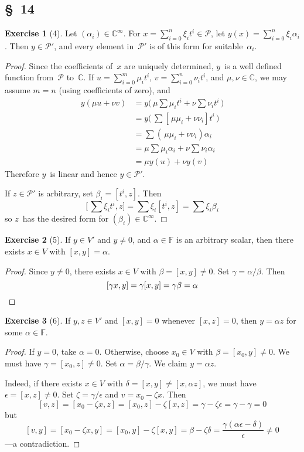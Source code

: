 \documentclass[letterpaper,12pt]{article}
\newcommand{\F}{\mathbb{F}}
\newcommand{\C}{\mathbb{C}}
\renewcommand{\P}{\mathcal{P}}
\theoremstyle{definition}
\newtheorem*{exer}{Exercise}
\theoremstyle{remark}
\theoremstyle{direction}
\begin{document}
\subsection*{\S~14}
\begin{exer}[4]
Let \((\alpha_i)\in\C^{\infty}\). For \(x=\sum_{i=0}^n\xi_i t^i\in\P\), let \(y(x)=\sum_{i=0}^n\xi_i\alpha_i\). Then \(y\in\P'\), and every element in~\(\P'\) is of this form for suitable~\(\alpha_i\).
\end{exer}
\begin{proof}
Since the coefficients of~\(x\) are uniquely determined, \(y\)~is a well defined function from~\(\P\) to~\(\C\). If \(u=\sum_{i=0}^m\mu_i t^i\), \(v=\sum_{i=0}^n\nu_i t^i\), and \(\mu,\nu\in\C\), we may assume \(m=n\) (using coefficients of zero), and
\begin{align*}
y(\mu u+\nu v)&=y\bigl(\,\mu\sum\mu_i t^i+\nu\sum\nu_i t^i\,\bigr)\\
	&=y\bigl(\,\sum[\,\mu\mu_i+\nu\nu_i]t^i\,\bigr)\\
	&=\sum(\,\mu\mu_i+\nu\nu_i)\alpha_i\\
	&=\mu\sum\mu_i\alpha_i+\nu\sum\nu_i\alpha_i\\
	&=\mu y(u)+\nu y(v)
\end{align*}
Therefore \(y\)~is linear and hence \(y\in\P'\).

If \(z\in\P'\) is arbitrary, set \(\beta_i=[t^i,z]\). Then
\[\bigl[\,\sum\xi_i t^i,z\bigr]=\sum\xi_i[t^i,z]=\sum\xi_i\beta_i\]
so \(z\)~has the desired form for \((\beta_i)\in\C^{\infty}\).
\end{proof}
\begin{exer}[5]
If \(y\in V'\) and \(y\ne0\), and \(\alpha\in\F\) is an arbitrary scalar, then there exists \(x\in V\) with \([x,y]=\alpha\).
\end{exer}
\begin{proof}
Since \(y\ne0\), there exists \(x\in V\) with \(\beta=[x,y]\ne0\). Set \(\gamma=\alpha/\beta\). Then
\[[\gamma x,y]=\gamma[x,y]=\gamma\beta=\alpha\qedhere\]
\end{proof}
\begin{exer}[6]
If \(y,z\in V'\) and \([x,y]=0\) whenever \([x,z]=0\), then \(y=\alpha z\) for some \(\alpha\in\F\).
\end{exer}
\begin{proof}
If \(y=0\), take \(\alpha=0\). Otherwise, choose \(x_0\in V\) with \(\beta=[x_0,y]\ne0\). We must have \(\gamma=[x_0,z]\ne0\). Set \(\alpha=\beta/\gamma\). We claim \(y=\alpha z\).

Indeed, if there exists \(x\in V\) with \(\delta=[x,y]\ne[x,\alpha z]\), we must have \(\epsilon=[x,z]\ne0\). Set \(\zeta=\gamma/\epsilon\) and \(v=x_0-\zeta x\). Then
\[[v,z]=[x_0-\zeta x,z]=[x_0,z]-\zeta[x,z]=\gamma-\zeta\epsilon=\gamma-\gamma=0\]
but
\[[v,y]=[x_0-\zeta x,y]=[x_0,y]-\zeta[x,y]=\beta-\zeta\delta=\frac{\gamma(\alpha\epsilon-\delta)}{\epsilon}\ne0\]
---a contradiction.
\end{proof}
\end{document}
